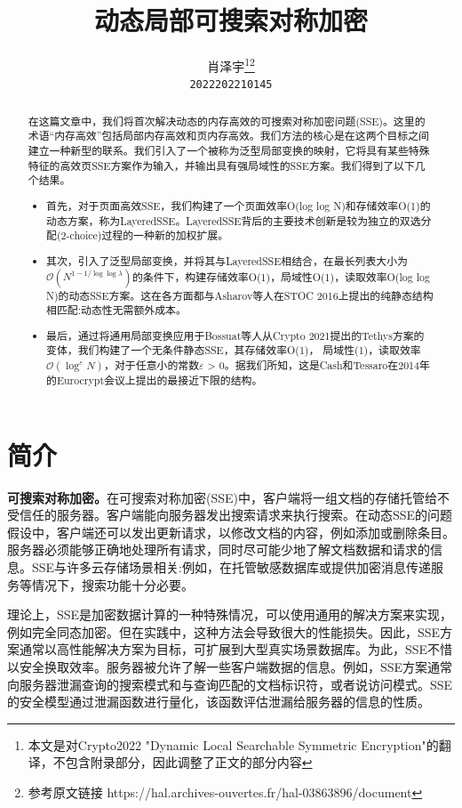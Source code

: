 \documentclass[UTF8]{article}
\title{动态局部可搜索对称加密}
\author{%
  肖泽宇\thanks{本文是对Crypto2022 "Dynamic Local Searchable Symmetric Encryption"的翻译，不包含附录部分，因此调整了正文的部分内容}\thanks{参考原文链接 https://hal.archives-ouvertes.fr/hal-03863896/document} \\
  \texttt{2022202210145} \\
}
\begin{document}
\maketitle


\begin{abstract}
  在这篇文章中，我们将首次解决动态的内存高效的可搜索对称加密问题(SSE)。这里的术语“内存高效”包括局部内存高效和页内存高效。我们方法的核心是在这两个目标之间建立一种新型的联系。我们引入了一个被称为泛型局部变换的映射，它将具有某些特殊特征的高效页SSE方案作为输入，并输出具有强局域性的SSE方案。我们得到了以下几个结果。
  \begin{itemize}
    \item 首先，对于页面高效SSE，我们构建了一个页面效率O(log log N)和存储效率O(1)的动态方案，称为LayeredSSE。LayeredSSE背后的主要技术创新是较为独立的双选分配(2-choice)过程的一种新的加权扩展。
    \item 其次，引入了泛型局部变换，并将其与LayeredSSE相结合，在最长列表大小为$\mathcal{O}\left(N^{1-1 / \log \log \lambda}\right)$的条件下，构建存储效率O(1)，局域性O(1)，读取效率O(log log N)的动态SSE方案。这在各方面都与Asharov等人在STOC 2016上提出的纯静态结构相匹配:动态性无需额外成本。
    \item 最后，通过将通用局部变换应用于Bossuat等人从Crypto 2021提出的Tethys方案的变体，我们构建了一个无条件静态SSE，其存储效率O(1)， 局域性(1)，读取效率$\mathcal{O}\left(\log ^{\varepsilon} N\right)$，对于任意小的常数$\varepsilon$ > 0。据我们所知，这是Cash和Tessaro在2014年的Eurocrypt会议上提出的最接近下限的结构。
  \end{itemize}
\end{abstract}


\section{简介}
\textbf{可搜索对称加密。}在可搜索对称加密(SSE)中，客户端将一组文档的存储托管给不受信任的服务器。客户端能向服务器发出搜索请求来执行搜索。在动态SSE的问题假设中，客户端还可以发出更新请求，以修改文档的内容，例如添加或删除条目。服务器必须能够正确地处理所有请求，同时尽可能少地了解文档数据和请求的信息。SSE与许多云存储场景相关:例如，在托管敏感数据库或提供加密消息传递服务等情况下，搜索功能十分必要。

理论上，SSE是加密数据计算的一种特殊情况，可以使用通用的解决方案来实现，例如完全同态加密。但在实践中，这种方法会导致很大的性能损失。因此，SSE方案通常以高性能解决方案为目标，可扩展到大型真实场景数据库。为此，SSE不惜以安全换取效率。服务器被允许了解一些客户端数据的信息。例如，SSE方案通常向服务器泄漏查询的搜索模式和与查询匹配的文档标识符，或者说访问模式。SSE的安全模型通过泄漏函数进行量化，该函数评估泄漏给服务器的信息的性质。
\end{document}
